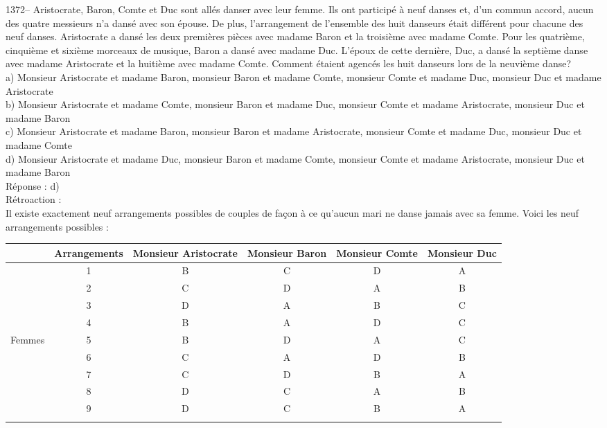 ﻿\documentclass[letterpaper, 12pt]{article}
\begin{document}
1372-- Aristocrate, Baron, Comte et Duc sont all\'es danser avec
leur femme. Ils ont particip\'e \`a neuf danses et, d'un commun
accord, aucun des quatre messieurs n'a dans\'e avec son \'epouse. De
plus, l'arrangement de l'ensemble des huit danseurs \'etait
diff\'erent pour chacune des neuf danses. Aristocrate a dans\'e les
deux premi\`eres pi\`eces avec madame Baron et la troisi\`eme avec
madame Comte. Pour les quatri\`eme, cinqui\`eme et sixi\`eme
morceaux de musique, Baron a dans\'e avec madame Duc.  L'\'epoux de
cette derni\`ere, Duc, a dans\'e la septi\`eme danse avec madame
Aristocrate et la huiti\`eme avec madame Comte.
Comment \'etaient agenc\'es les huit danseurs lors de la neuvi\`eme danse?\\
a) Monsieur Aristocrate et madame Baron, monsieur Baron et madame Comte,
monsieur Comte et madame Duc, monsieur Duc et madame Aristocrate\\
b) Monsieur Aristocrate et madame Comte, monsieur Baron et madame Duc,
monsieur Comte et madame Aristocrate, monsieur Duc et madame Baron\\
c) Monsieur Aristocrate et madame Baron, monsieur Baron et madame
Aristocrate, monsieur Comte et madame Duc, monsieur Duc et madame Comte\\
d) Monsieur Aristocrate et madame Duc, monsieur Baron et madame Comte,
monsieur Comte et madame Aristocrate, monsieur Duc et madame Baron\\

R\'eponse : d)\\

R\'etroaction : \\
Il existe exactement neuf arrangements possibles de couples de fa\c con \`a
ce qu'aucun mari ne danse jamais avec sa femme.  Voici les neuf arrangements
possibles :  \\
\begin{tabular}{|c|c|c|c|c|c|}
\hline
        &  Arrangements   & Monsieur Aristocrate & Monsieur Baron & Monsieur
Comte & Monsieur Duc    \\ \hline \hline
        &   1             & B           & C     & D      & A      \\
\cline{2-6}
        &   2             & C           & D     & A      & B      \\
\cline{2-6}
        &   3             & D           & A     & B      & C      \\
\cline{2-6}
        &   4             & B           & A     & D      & C      \\
\cline{2-6}
Femmes  &   5             & B           & D     & A      & C      \\
\cline{2-6}
        &   6             & C           & A     & D      & B      \\
\cline{2-6}
        &   7             & C           & D     & B      & A      \\
\cline{2-6}
        &   8             & D           & C     & A      & B      \\
\cline{2-6}
        &   9             & D           & C     & B      & A      \\ \hline
\multicolumn{6}{c}{}\\
\end{tabular}\\
\end{document}
